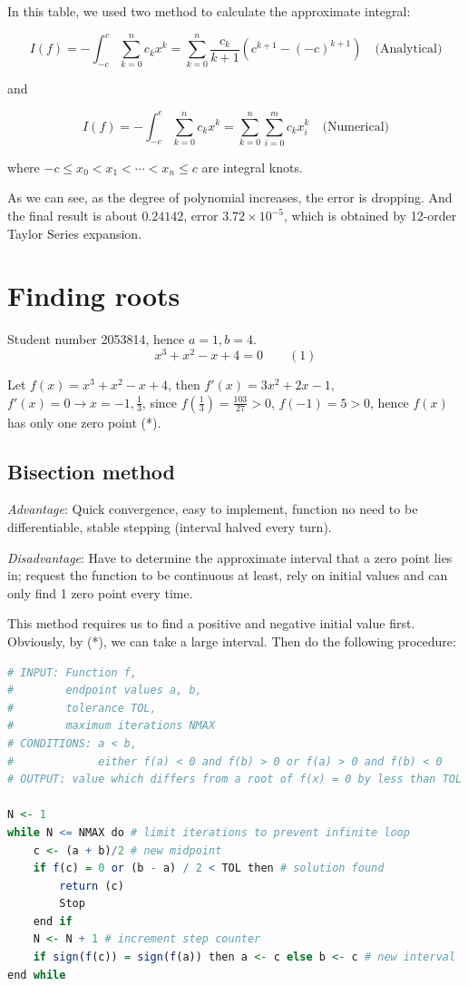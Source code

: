\documentclass{article}
\begin{document}
In this table, we used two method to calculate the approximate integral:

$$I(f)=-\int_{-c}^{c}\sum_{k=0}^{n} c_k x^k=\sum_{k=0}^n \frac{c_k}{k+1}(c^{k+1}-(-c)^{k+1})\quad \text{(Analytical)}$$

and

$$I(f)=-\int_{-c}^{c}\sum_{k=0}^{n} c_k x^k=\sum_{k=0}^n \sum_{i=0}^m c_kx_i^k\quad \text{(Numerical)}$$

where $-c\leq x_0<x_1<\cdots<x_n\leq c$ are integral knots. 

As we can see, as the degree of polynomial increases, the error is dropping. And the final result is about $0.24142$, error $3.72\times 10^{-5}$, which is obtained by 12-order Taylor Series expansion.

\section{Finding roots}

Student number 2053814, hence $a=1,b=4$. 
$$x^3+x^2-x+4=0\qquad (1)$$

Let $f(x)=x^3+x^2-x+4$, then $f'(x)=3x^2+2x-1$, $\displaystyle f'(x)=0\to x=-1,\frac{1}{3}$, since $\displaystyle f(\frac{1}{3})=\frac{103}{27}>0$, $f(-1)=5>0$, hence $f(x)$ has only one zero point (*).

\subsection{Bisection method}

\emph{Advantage}: Quick convergence, easy to implement, function no need to be differentiable, stable stepping (interval halved every turn).

\emph{Disadvantage}: Have to determine the approximate interval that a zero point lies in; request the function to be continuous at least, rely on initial values and can only find 1 zero point every time. 

\sepline

This method requires us to find a positive and negative initial value first. Obviously, by (*), we can take a large interval. Then do the following procedure\cite{bisection}:

\begin{lstlisting}[language=R, caption=Bisection Algorithm]
# INPUT: Function f, 
#        endpoint values a, b, 
#        tolerance TOL, 
#        maximum iterations NMAX
# CONDITIONS: a < b, 
#             either f(a) < 0 and f(b) > 0 or f(a) > 0 and f(b) < 0
# OUTPUT: value which differs from a root of f(x) = 0 by less than TOL
 
N <- 1
while N <= NMAX do # limit iterations to prevent infinite loop
    c <- (a + b)/2 # new midpoint
    if f(c) = 0 or (b - a) / 2 < TOL then # solution found
        return (c)
        Stop
    end if
    N <- N + 1 # increment step counter
    if sign(f(c)) = sign(f(a)) then a <- c else b <- c # new interval
end while
\end{lstlisting}
\end{document}
